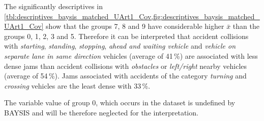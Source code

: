 The significantly descriptives in \cref{tbl:descriptives_baysis_matched_UArt1_Cov,fig:descriptives_baysis_matched_UArt1_Cov} show that the groups 7, 8 and 9 have considerable higher $\bar{x}$ than the groups 0, 1, 2, 3 and 5. Therefore it can be interpreted that accident collisions with \textit{starting}, \textit{standing}, \textit{stopping}, \textit{ahead and waiting vehicle} and \textit{vehicle on separate lane in same direction} vehicles (average of 41\,\%) are associated with less dense jams than accident collisions with \textit{obstacles} or \textit{left/right} nearby vehicles (average of 54\,\%). Jams associated with accidents of the category \textit{turning} and \textit{crossing} vehicles are the least dense with 33\,\%.

 The variable value of group 0, which occurs in the dataset is undefined by BAYSIS and will be therefore neglected for the interpretation.  

